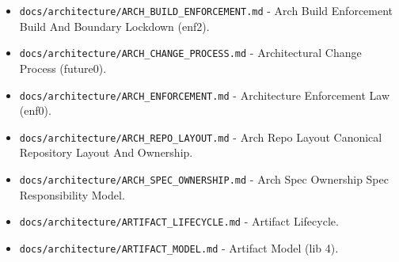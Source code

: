 \documentclass[9pt,a4paper,openany]{book}
\begin{document}
\begin{itemize}
\item \texttt{docs/\allowbreak{}architecture/\allowbreak{}ARCH\_\allowbreak{}BUILD\_\allowbreak{}ENFORCEMENT.\allowbreak{}md} -\allowbreak{} Arch Build Enforcement Build And Boundary Lockdown (enf2).\allowbreak{}
\end{itemize}

\begin{itemize}
\item \texttt{docs/\allowbreak{}architecture/\allowbreak{}ARCH\_\allowbreak{}CHANGE\_\allowbreak{}PROCESS.\allowbreak{}md} -\allowbreak{} Architectural Change Process (future0).\allowbreak{}
\end{itemize}

\begin{itemize}
\item \texttt{docs/\allowbreak{}architecture/\allowbreak{}ARCH\_\allowbreak{}ENFORCEMENT.\allowbreak{}md} -\allowbreak{} Architecture Enforcement Law (enf0).\allowbreak{}
\end{itemize}

\begin{itemize}
\item \texttt{docs/\allowbreak{}architecture/\allowbreak{}ARCH\_\allowbreak{}REPO\_\allowbreak{}LAYOUT.\allowbreak{}md} -\allowbreak{} Arch Repo Layout Canonical Repository Layout And Ownership.\allowbreak{}
\end{itemize}

\begin{itemize}
\item \texttt{docs/\allowbreak{}architecture/\allowbreak{}ARCH\_\allowbreak{}SPEC\_\allowbreak{}OWNERSHIP.\allowbreak{}md} -\allowbreak{} Arch Spec Ownership Spec Responsibility Model.\allowbreak{}
\end{itemize}

\begin{itemize}
\item \texttt{docs/\allowbreak{}architecture/\allowbreak{}ARTIFACT\_\allowbreak{}LIFECYCLE.\allowbreak{}md} -\allowbreak{} Artifact Lifecycle.\allowbreak{}
\end{itemize}

\begin{itemize}
\item \texttt{docs/\allowbreak{}architecture/\allowbreak{}ARTIFACT\_\allowbreak{}MODEL.\allowbreak{}md} -\allowbreak{} Artifact Model (lib 4).\allowbreak{}
\end{itemize}
\end{document}
